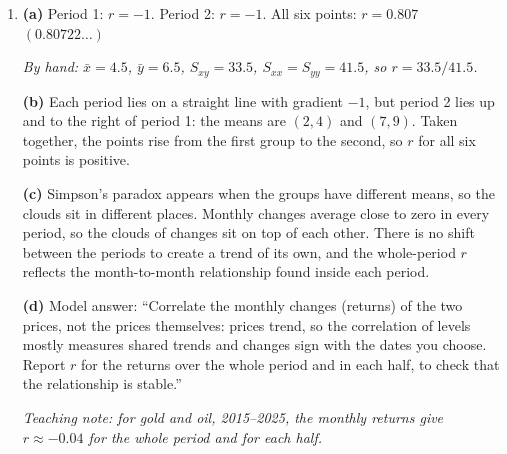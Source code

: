 \documentclass[12pt, twoside]{article}
\begin{document}
\begin{enumerate}[itemsep=0.3cm]
\emph{For example, September: $\dfrac{1.4342 - 1.4955}{1.4955} \times 100
= -4.0990\ldots$. Common errors: percentage change of the yield
($-0.20/3.89 = -5.14\%$) instead of the change in percentage points;
dividing by this month's value instead of last month's.}

\textbf{(b)} 2003--2007: $r = -0.25$; 2008--2011: $r = -0.15$; 2003--2011:
$r = -0.18$. All three are weak or very weak and \emph{negative}. Unlike the
levels in 2(a), the changes give the same sign for each period and for the
whole period: there is no Simpson's paradox.

\textbf{(c)} $r < 0$: in a month when the US yield rises, EUR/USD tends to
fall, so the dollar tends to get \emph{stronger}. A stronger dollar raises
the euro value of the investor's dollars. This currency gain partly offsets
the loss on the bonds, so the two risks partly cancel, and the investor's
total risk is smaller than it would be if the two moved independently.

\emph{The offset is small: $r = -0.18$ is very weak. Class examples from
the table: October 2008 (yield $+0.12$, dollar $7.5\%$ stronger) and
December 2008 (yield $-1.11$, bond gain; dollar $6\%$ weaker, currency
loss).}

\bigskip \hrule \bigskip

\item[4.]

\textbf{(a)} Period 1: $r = -1$. \quad Period 2: $r = -1$. \quad All six
points: $r = 0.807$ \quad $(0.80722\ldots)$

\emph{By hand: $\bar{x} = 4.5$, $\bar{y} = 6.5$, $S_{xy} = 33.5$,
$S_{xx} = S_{yy} = 41.5$, so $r = 33.5/41.5$.}

\textbf{(b)} Each period lies on a straight line with gradient $-1$, but
period 2 lies up and to the right of period 1: the means are $(2, 4)$ and
$(7, 9)$. Taken together, the points rise from the first group to the
second, so $r$ for all six points is positive.

\textbf{(c)} Simpson's paradox appears when the groups have different
means, so the clouds sit in different places. Monthly changes average close
to zero in every period, so the clouds of changes sit on top of each other.
There is no shift between the periods to create a trend of its own, and
the whole-period $r$ reflects the month-to-month relationship found inside
each period.

\textbf{(d)} Model answer: ``Correlate the monthly changes (returns) of the
two prices, not the prices themselves: prices trend, so the correlation of
levels mostly measures shared trends and changes sign with the dates you
choose. Report $r$ for the returns over the whole period and in each half,
to check that the relationship is stable.''

\emph{Teaching note: for gold and oil, 2015--2025, the monthly returns give
$r \approx -0.04$ for the whole period and for each half.}

\end{enumerate}
\end{document}
